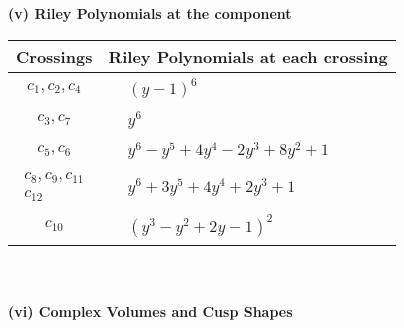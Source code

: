 \documentclass[1p]{elsarticle_modified}
\theoremstyle{definition}
\begin{document}
\newpage\renewcommand{\arraystretch}{1}
\flushleft \textbf{(v) Riley Polynomials at the component}\newline \\
\begin{tabular}{m{50pt}|m{274pt}}
Crossings & \hspace{64pt}Riley Polynomials at each crossing \\
\hline $$\begin{aligned}c_{1},c_{2},c_{4}\end{aligned}$$&$\begin{aligned}
&(y-1)^6
\end{aligned}$\\
\hline $$\begin{aligned}c_{3},c_{7}\end{aligned}$$&$\begin{aligned}
&y^6
\end{aligned}$\\
\hline $$\begin{aligned}c_{5},c_{6}\end{aligned}$$&$\begin{aligned}
&y^6- y^5+4 y^4-2 y^3+8 y^2+1
\end{aligned}$\\
\hline $$\begin{aligned}c_{8},c_{9},c_{11}\\c_{12}\end{aligned}$$&$\begin{aligned}
&y^6+3 y^5+4 y^4+2 y^3+1
\end{aligned}$\\
\hline $$\begin{aligned}c_{10}\end{aligned}$$&$\begin{aligned}
&(y^3- y^2+2 y-1)^2
\end{aligned}$\\
\hline
\end{tabular}\\~\\
\newpage\flushleft \textbf{(vi) Complex Volumes and Cusp Shapes}
\end{document}
